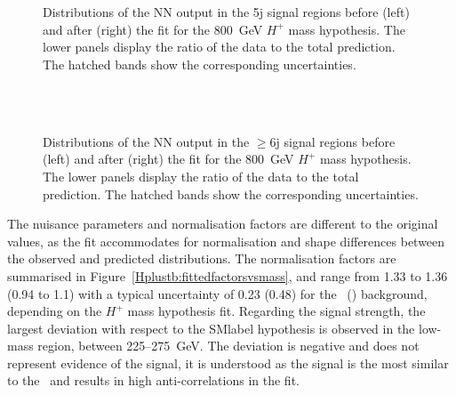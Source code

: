 \begin{figure}[htb]
    \RawFloats
    \centering
    \\
    \\
    \caption{Distributions of the NN output in the 5j signal regions before (left) and after (right) the fit for the 800~GeV $H^+$ mass hypothesis. The lower panels display the ratio of the data to the total prediction. The hatched bands show the corresponding uncertainties.
    }
    \label{Hplustb:prepost8005j}
\end{figure}

\begin{figure}[htb]
    \RawFloats
    \centering
    \\
    \\
    \caption{Distributions of the NN output in the $\geq$6j signal regions before (left) and after (right) the fit for the 800~GeV $H^+$ mass hypothesis. The lower panels display the ratio of the data to the total prediction. The hatched bands show the corresponding uncertainties.
    }
    \label{Hplustb:prepost8006j}
\end{figure}
\clearpage

The nuisance parameters and normalisation factors are different to the original values, as the fit accommodates for normalisation and shape differences between the observed and predicted distributions. The normalisation factors are summarised in Figure~\ref{Hplustb:fittedfactorsvsmass}, and range from 1.33 to 1.36 (0.94 to 1.1) with a typical uncertainty of 0.23 (0.48) for the \ttb\ (\ttc) background, depending on the $H^+$ mass hypothesis fit. Regarding the signal strength, the largest deviation with respect to the \acrshort{SMlabel} hypothesis is observed in the low-mass region, between 225--275~GeV. The deviation is negative and does not represent evidence of the signal, it is understood as the signal is the most similar to the \ttHF\ and results in high anti-correlations in the fit.

